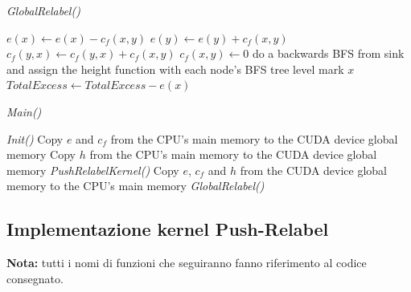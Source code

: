         \begin{algorithm}
            \caption{\textit{GlobalRelabel()}}\label{alg:parallel-global-relabel}
            \begin{algorithmic}
                        \State $e(x) \gets e(x) - c_f(x,y)$
                        \State $e(y) \gets e(y) + c_f(x,y)$
                        \State $c_f(y,x) \gets c_f(y,x) + c_f(x,y)$
                        \State $c_f(x,y) \gets 0$
                    \EndIf
                \EndFor
                \State do a backwards BFS from sink and assign the height function with each node’s BFS tree level
                            \State mark $x$
                            \State $TotalExcess \gets TotalExcess - e(x)$
                        \EndIf
                    \EndFor
                \EndIf
            \end{algorithmic}
        \end{algorithm}

        \begin{algorithm}
            \caption{\textit{Main()}}\label{alg:parallel-main}
            \begin{algorithmic}
                \State \textit{Init()}
                \State Copy $e$ and $c_f$ from the CPU's main memory to the CUDA device global memory
                    \State Copy $h$ from the CPU's main memory to the CUDA device global memory
                    \State \textit{PushRelabelKernel()}
                    \State Copy $e$, $c_f$ and $h$ from the CUDA device global memory to the CPU's main memory
                    \State \textit{GlobalRelabel()}
                \EndWhile
            \end{algorithmic}
        \end{algorithm}


        \subsection{Implementazione kernel Push-Relabel}

            \textbf{Nota:} tutti i nomi di funzioni che seguiranno fanno riferimento al codice consegnato.
            
